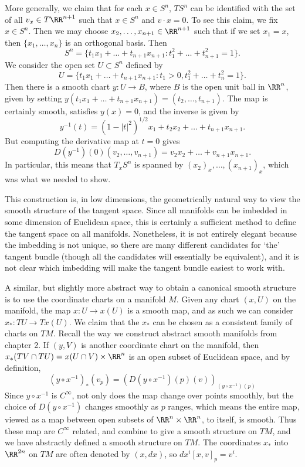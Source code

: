 \begin{example}
    More generally, we claim that for each $x \in S^n$, $TS^n$ can be identified with the set of all $v_x \in T\RR^{n+1}$ such that $x \in S^n$ and $v \cdot x = 0$. To see this claim, we fix $x \in S^n$. Then we may choose $x_2, \dots, x_{n+1} \in \RR^{n+1}$ such that if we set $x_1 = x$, then $\{ x_1, \dots, x_n \}$ is an orthogonal basis. Then
    \[ S^n = \{ t_1x_1 + \dots + t_{n+1}x_{n+1} : t_1^2 + \dots + t_{n+1}^2 = 1 \}. \]
    We consider the open set $U \subset S^n$ defined by
    \[ U = \{ t_1x_1 + \dots + t_{n+1}x_{n+1} : t_1 > 0, t_1^2 + \dots + t_n^2 = 1 \}. \]
    Then there is a smooth chart $y: U \to B$, where $B$ is the open unit ball in $\RR^n$, given by setting $y(t_1x_1 + \dots + t_{n+1}x_{n+1}) = (t_2, \dots, t_{n+1})$. The map is certainly smooth, satisfies $y(x) = 0$, and the inverse is given by
    \[ y^{-1}(t) = (1 - |t|^2)^{1/2} x_1 + t_2x_2 + \dots + t_{n+1}x_{n+1}. \]
    But computing the derivative map at $t = 0$ gives
    \[ D(y^{-1})(0)(v_2, \dots, v_{n+1}) = v_2x_2 + \dots + v_{n+1} x_{n+1}. \]
    In particular, this means that $T_xS^n$ is spanned by $(x_2)_x, \dots, (x_{n+1})_x$, which was what we needed to show.
\end{example}

This construction is, in low dimensions, the geometrically natural way to view the smooth structure of the tangent space. Since all manifolds can be imbedded in some dimension of Euclidean space, this is certainly a sufficient method to define the tangent space on all manifolds. Nonetheless, it is not entirely elegant because the imbedding is not unique, so there are many different candidates for `the' tangent bundle (though all the candidates will essentially be equivalent), and it is not clear which imbedding will make the tangent bundle easiest to work with.

A similar, but slightly more abstract way to obtain a canonical smooth structure is to use the coordinate charts on a manifold $M$. Given any chart $(x,U)$ on the manifold, the map $x: U \to x(U)$ is a smooth map, and as such we can consider $x_*: TU \to Tx(U)$. We claim that the $x_*$ can be chosen as a consistent family of charts on $TM$. Recall the way we construct abstract smooth manifolds from chapter 2. If $(y,V)$ is another coordinate chart on the manifold, then $x_*(TV \cap TU) = x(U \cap V) \times \RR^n$ is an open subset of Euclidean space, and by definition,
%
\[ (y \circ x^{-1})_*(v_p) = (D(y \circ x^{-1})(p)(v))_{(y \circ x^{-1})(p)} \]
%
Since $y \circ x^{-1}$ is $C^\infty$, not only does the map change over points smoothly, but the choice of $D(y \circ x^{-1})$ changes smoothly as $p$ ranges, which means the entire map, viewed as a map between open subsets of $\RR^n \times \RR^n$, to itself, is smooth. Thus these map are $C^\infty$ related, and combine to give a smooth structure on $TM$, and we have abstractly defined a smooth structure on $TM$. The coordinates $x_*$ into $\RR^{2n}$ on $TM$ are often denoted by $(x,dx)$, so $dx^i[x,v]_p = v^i$.

